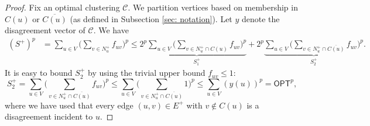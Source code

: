 \documentclass[11pt]{article}
\begin{document}
\begin{proof}
Fix an optimal clustering $\mathcal{C}$. 
We partition vertices based on membership in $C(u)$ or $\overline{C(u)}$ (as defined in Subsection \ref{sec: notation}). Let $y$ denote the disagreement vector of $\mathcal{C}$. We have
\begin{align*}
    (S^+)^p &= \sum_{u \in V} \Big( \sum_{v \in N_u^+} f_{uv}\Big)^p 
    \leq 2^p \underbrace{\sum_{u \in V} \Big(\sum_{v \in N_u^+ \cap C(u)} f_{uv}\Big)^p}_{S_1^+} + 2^p \underbrace{\sum_{u \in V} \Big(\sum_{v \in N_u^+ \cap \overline{C(u)}} f_{uv}\Big)^p}_{S_2^+}.
\end{align*}
 It is easy to bound $S_2^+$ by using the trivial upper bound $f_{uv} \leq 1$:
\[\boxed{S_2^+ = \sum_{u \in V} \Big(\sum_{v \in N_u^+ \cap \overline{C(u)}} f_{uv}\Big)^p \leq \sum_{u \in V} \Big(\sum_{v \in N_u^+ \cap \overline{C(u)}} 1 \Big)^p \leq \sum_{u \in V} (y(u))^p = \textsf{OPT}^p,}\]
where we have used that every edge $(u,v) \in E^+$ with $v \not \in C(u)$ is a disagreement incident to $u$.


\end{proof}
\end{document}

